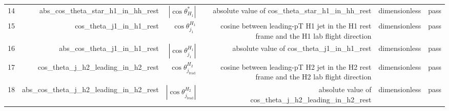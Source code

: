 \begin{table}[htbp]
{\begin{tabular}{lrrrrr}
14 & abs\_cos\_theta\_star\_h1\_in\_hh\_rest & $|\cos\theta^{*}_{H_1}|$ & absolute value of cos\_theta\_star\_h1\_in\_hh\_rest & dimensionless & pass \\
15 & cos\_theta\_j1\_in\_h1\_rest & $\cos\theta_{j_1}^{H_1}$ & cosine between leading-pT H1 jet in the H1 rest frame and the H1 lab flight direction & dimensionless & pass \\
16 & abs\_cos\_theta\_j1\_in\_h1\_rest & $|\cos\theta_{j_1}^{H_1}|$ & absolute value of cos\_theta\_j1\_in\_h1\_rest & dimensionless & pass \\
17 & cos\_theta\_j\_h2\_leading\_in\_h2\_rest & $\cos\theta_{j_{\mathrm{lead}}}^{H_2}$ & cosine between leading-pT H2 jet in the H2 rest frame and the H2 lab flight direction & dimensionless & pass \\
18 & abs\_cos\_theta\_j\_h2\_leading\_in\_h2\_rest & $|\cos\theta_{j_{\mathrm{lead}}}^{H_2}|$ & absolute value of cos\_theta\_j\_h2\_leading\_in\_h2\_rest & dimensionless & pass \\
\bottomrule
\end{tabular}
}
\end{table}
